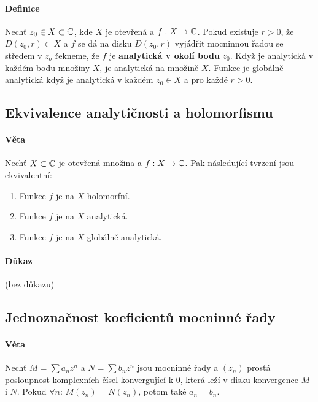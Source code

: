 \documentclass[a4paper,10pt]{article}
\begin{document}
\paragraph{Definice}
Nechť $z_0 \in X \subset \mathbb{C}$, kde $X$ je otevřená a $f: X \to \mathbb{C}$. Pokud
existuje $r > 0$, že $D(z_0, r) \subset X$ a $f$ se dá na disku $D(z_0,r)$
vyjádřit mocninnou řadou se středem v $z_o$ řekneme, že $f$ je \textbf{analytická v okolí
bodu} $z_0$. Když je analytická v každém bodu množiny $X$, je analytická na
množině $X$. Funkce je globálně analytická když je analytická v každém $z_0 \in
X$ a pro každé $r > 0$.


\subsection{Ekvivalence analytičnosti a holomorfismu}
\label{ekvivalence-ah}
\setcounter{equation}{0}
\paragraph{Věta}
Nechť $X \subset \mathbb{C}$ je otevřená množina a $f: X \to \mathbb{C}$. Pak následující
tvrzení jsou ekvivalentní:
\begin{enumerate}
	\item Funkce $f$ je na $X$ holomorfní.
	\item Funkce $f$ je na $X$ analytická.
	\item Funkce $f$ je na $X$ globálně analytická.
\end{enumerate}
\paragraph{Důkaz}
(bez důkazu)


\subsection{Jednoznačnost koeficientů mocninné řady}
\setcounter{equation}{0}
\paragraph{Věta}
Nechť $M = \sum a_nz^n$ a $N = \sum b_n z^n$ jsou mocninné řady a $(z_n)$ prostá
posloupnost komplexních čísel konvergující k 0, která leží v disku konvergence
$M$ i $N$. Pokud $\forall n$: $M(z_n) = N(z_n)$, potom také $a_n = b_n$.
\end{document}
